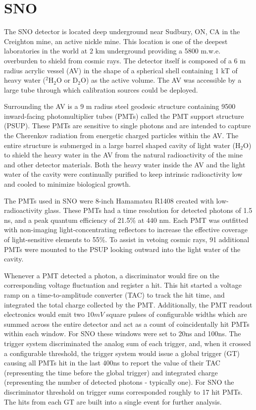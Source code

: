 \section{SNO}

The SNO detector is located deep underground near Sudbury, ON, CA in the Creighton mine, an active nickle mine.
This location is one of the deepest laboratories in the world at $2$ km underground providing a 5800 m.w.e. overburden to shield from cosmic rays.
The detector itself is composed of a 6 m radius acrylic vessel (AV) in the shape of a spherical shell containing 1 kT of heavy water ($^2$H$_2$O or D$_2$O) as the active volume.
The AV was accessible by a large tube through which calibration sources could be deployed.

Surrounding the AV is a 9 m radius steel geodesic structure containing 9500 inward-facing photomultiplier tubes (PMTs) called the PMT support structure (PSUP).
These PMTs are sensitive to single photons and are intended to capture the Cherenkov radiation from energetic charged particles within the AV.
The entire structure is submerged in a large barrel shaped cavity of light water (H$_2$O) to shield the heavy water in the AV from the natural radioactivity of the mine and other detector materials.
Both the heavy water inside the AV and the light water of the cavity were continually purified to keep intrinsic radioactivity low and cooled to minimize biological growth.

The PMTs used in SNO were 8-inch Hamamatsu R1408 created with low-radioactivity glass. 
These PMTs had a time resolution for detected photons of 1.5 ns, and a peak quantum efficiency of 21.5\% at 440 nm.
Each PMT was outfitted with non-imaging light-concentrating reflectors to increase the effective coverage of light-sensitive elements to 55\%.
To assist in vetoing cosmic rays, 91 additional PMTs were mounted to the PSUP looking outward into the light water of the cavity. 

Whenever a PMT detected a photon, a discriminator would fire on the corresponding voltage fluctuation and register a hit.
This hit started a voltage ramp on a time-to-amplitude converter (TAC) to track the hit time, and integrated the total charge collected by the PMT.
Additionally, the PMT readout electronics would emit two $10mV$ square pulses of configurable widths which are summed across the entire detector and act as a count of coincidentally hit PMTs within each window.
For SNO these windows were set to 20ns and 100ns.
The trigger system discriminated the analog sum of each trigger, and, when it crossed a configurable threshold, the trigger system would issue a global trigger (GT) causing all PMTs hit in the last 400ns to report the value of their TAC (representing the time before the global trigger) and integrated charge (representing the number of detected photons - typically one).
For SNO the discriminator threshold on trigger sums corresponded roughly to 17 hit PMTs.
The hits from each GT are built into a single event for further analysis.

